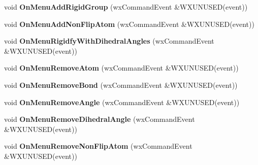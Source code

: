 \begin{DoxyCompactItemize}
\item 
\mbox{\label{class_obj_cryst_1_1_w_x_molecule_a5b9eca62a8f3703c42cc664e02533066}} 
void {\bfseries On\+Menu\+Add\+Rigid\+Group} (wx\+Command\+Event \&W\+X\+U\+N\+U\+S\+ED(event))
\item 
\mbox{\label{class_obj_cryst_1_1_w_x_molecule_a29fba35950c9e89af4fb1d19e7abf0a0}} 
void {\bfseries On\+Menu\+Add\+Non\+Flip\+Atom} (wx\+Command\+Event \&W\+X\+U\+N\+U\+S\+ED(event))
\item 
\mbox{\label{class_obj_cryst_1_1_w_x_molecule_adda44dc2550db73e8441765eb39d74b5}} 
void {\bfseries On\+Menu\+Rigidfy\+With\+Dihedral\+Angles} (wx\+Command\+Event \&W\+X\+U\+N\+U\+S\+ED(event))
\item 
\mbox{\label{class_obj_cryst_1_1_w_x_molecule_ac4eeca65577162ccf83650be1963e24a}} 
void {\bfseries On\+Menu\+Remove\+Atom} (wx\+Command\+Event \&W\+X\+U\+N\+U\+S\+ED(event))
\item 
\mbox{\label{class_obj_cryst_1_1_w_x_molecule_ae1405b673f0c1c1339d0eea853332a74}} 
void {\bfseries On\+Menu\+Remove\+Bond} (wx\+Command\+Event \&W\+X\+U\+N\+U\+S\+ED(event))
\item 
\mbox{\label{class_obj_cryst_1_1_w_x_molecule_a63c66c48faf827070ee62fc6e03f8861}} 
void {\bfseries On\+Menu\+Remove\+Angle} (wx\+Command\+Event \&W\+X\+U\+N\+U\+S\+ED(event))
\item 
\mbox{\label{class_obj_cryst_1_1_w_x_molecule_aba87db72c513cd77e9824cd174288e7e}} 
void {\bfseries On\+Menu\+Remove\+Dihedral\+Angle} (wx\+Command\+Event \&W\+X\+U\+N\+U\+S\+ED(event))
\item 
\mbox{\label{class_obj_cryst_1_1_w_x_molecule_a6369035c43565c7c1fd81b1707861c8a}} 
void {\bfseries On\+Menu\+Remove\+Non\+Flip\+Atom} (wx\+Command\+Event \&W\+X\+U\+N\+U\+S\+ED(event))
\item 
\mbox{\label{class_obj_cryst_1_1_w_x_molecule_aa22db407d0f3881ee4dd7810e4d8b2d6}} 

\end{DoxyCompactItemize}
